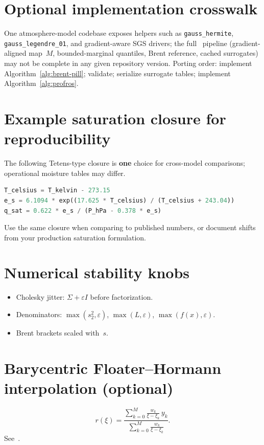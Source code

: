 \documentclass[11pt,a4paper]{article}
\begin{document}
\section{Optional implementation crosswalk}
\label{sec:julia-crosswalk}
One atmosphere-model codebase exposes helpers such as \texttt{gauss\_hermite}, \texttt{gauss\_legendre\_01}, and gradient-aware SGS drivers; the full \profileros\ pipeline (gradient-aligned map~$M$, bounded-marginal quantiles, Brent reference, cached surrogates) may not be complete in any given repository version.
Porting order: implement Algorithm~\ref{alg:brent-pill}; validate; serialize surrogate tables; implement Algorithm~\ref{alg:profros}.

\section{Example saturation closure for reproducibility}
\label{app:qsat}
The following Tetens-type closure is \textbf{one} choice for cross-model comparisons; operational moisture tables may differ.
\begin{lstlisting}[language=Python]
T_celsius = T_kelvin - 273.15
e_s = 6.1094 * exp((17.625 * T_celsius) / (T_celsius + 243.04))
q_sat = 0.622 * e_s / (P_hPa - 0.378 * e_s)
\end{lstlisting}
Use the same closure when comparing to published numbers, or document shifts from your production saturation formulation.

\section{Numerical stability knobs}
\begin{itemize}
  \item Cholesky jitter: $\Sigma+\varepsilon I$ before factorization.
  \item Denominators: $\max(s_2^2,\varepsilon)$, $\max(L,\varepsilon)$, $\max(f(x),\varepsilon)$.
  \item Brent brackets scaled with~$s$.
\end{itemize}

\section{Barycentric Floater--Hormann interpolation (optional)}
\begin{equation}
  r(\xi)=\frac{\sum_{k=0}^{M} \frac{w_k}{\xi-\xi_k}\,y_k}{\sum_{k=0}^{M} \frac{w_k}{\xi-\xi_k}}.
\end{equation}
See~\cite{floater}.
\end{document}
